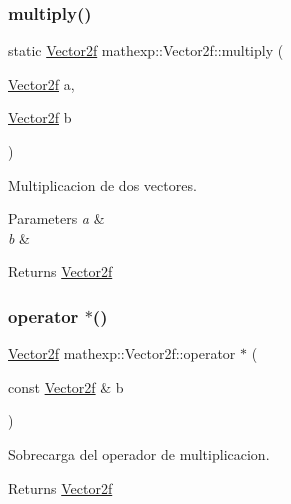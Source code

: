 \subsubsection{\texorpdfstring{multiply()}{multiply()}}
{\footnotesize\ttfamily static \mbox{\hyperlink{structmathexp_1_1_vector2f}{Vector2f}} mathexp\+::\+Vector2f\+::multiply (\begin{DoxyParamCaption}\item[{\mbox{\hyperlink{structmathexp_1_1_vector2f}{Vector2f}}}]{a,  }\item[{\mbox{\hyperlink{structmathexp_1_1_vector2f}{Vector2f}}}]{b }\end{DoxyParamCaption})\hspace{0.3cm}{\ttfamily [static]}}



Multiplicacion de dos vectores. 


\begin{DoxyParams}{Parameters}
{\em a} & \\
\hline
{\em b} & \\
\hline
\end{DoxyParams}
\begin{DoxyReturn}{Returns}
\mbox{\hyperlink{structmathexp_1_1_vector2f}{Vector2f}} 
\end{DoxyReturn}
\mbox{\label{structmathexp_1_1_vector2f_aa746c49d06e2ce59bfd8f2d2645f7c87}} 
\subsubsection{\texorpdfstring{operator $\ast$()}{operator *()}}
{\footnotesize\ttfamily \mbox{\hyperlink{structmathexp_1_1_vector2f}{Vector2f}} mathexp\+::\+Vector2f\+::operator $\ast$ (\begin{DoxyParamCaption}\item[{const \mbox{\hyperlink{structmathexp_1_1_vector2f}{Vector2f}} \&}]{b }\end{DoxyParamCaption})}



Sobrecarga del operador de multiplicacion. 

\begin{DoxyReturn}{Returns}
\mbox{\hyperlink{structmathexp_1_1_vector2f}{Vector2f}} 
\end{DoxyReturn}
\mbox{\label{structmathexp_1_1_vector2f_ad45318e0247e236fcfe3a07dc17088f8}} 
